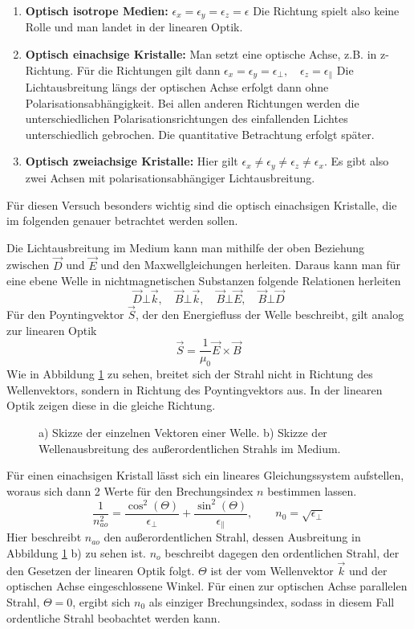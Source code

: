 \begin{enumerate}
    \item \textbf{Optisch isotrope Medien:} 
          $\epsilon_x = \epsilon_y = \epsilon_z = \epsilon$
          Die Richtung spielt also keine Rolle und man landet in der linearen Optik.

    \item \textbf{Optisch einachsige Kristalle:}
          Man setzt eine optische Achse, z.B. in z-Richtung. Für die Richtungen 
          gilt dann $\epsilon_x = \epsilon_y = \epsilon_{\bot}, \quad 
                     \epsilon_z = \epsilon_{\parallel}$
          Die Lichtausbreitung längs der optischen Achse erfolgt dann ohne
          Polarisationsabhängigkeit. Bei allen anderen Richtungen werden die 
          unterschiedlichen Polarisationsrichtungen des einfallenden Lichtes
          unterschiedlich gebrochen. Die quantitative Betrachtung erfolgt 
          später.
    \item \textbf{Optisch zweiachsige Kristalle:}
          Hier gilt $\epsilon_x \neq \epsilon_y \neq \epsilon_z \neq \epsilon_x$.
          Es gibt also zwei Achsen mit polarisationsabhängiger Lichtausbreitung.
\end{enumerate}
Für diesen Versuch besonders wichtig sind die optisch einachsigen Kristalle, die im
folgenden genauer betrachtet werden sollen.

Die Lichtausbreitung im Medium kann man mithilfe der oben Beziehung zwischen 
$\vec{D}$ und $\vec{E}$ und den Maxwellgleichungen herleiten. Daraus kann man 
für eine ebene Welle in nichtmagnetischen Substanzen folgende Relationen herleiten
\[
    \vec{D} \bot \vec{k}, \quad \vec{B} \bot \vec{k}, \quad
    \vec{B} \bot \vec{E}, \quad \vec{B} \bot \vec{D}
\]
Für den Poyntingvektor $\vec{S}$, der den Energiefluss der Welle beschreibt, 
gilt analog zur linearen Optik
\[
    \vec{S} = \frac{1}{\mu_0} \vec{E} \times \vec{B}
\]
Wie in Abbildung \ref{abb:doppel} zu sehen, breitet sich der Strahl nicht in
Richtung des Wellenvektors, sondern in Richtung des Poyntingvektors aus. In der
linearen Optik zeigen diese in die gleiche Richtung.
\begin{figure}[h]
  \centering
  
    \caption{a) Skizze der einzelnen Vektoren einer Welle. b) Skizze der 
             Wellenausbreitung des außerordentlichen Strahls im Medium.}
  \label{abb:doppel}
\end{figure}
Für einen einachsigen Kristall lässt sich ein lineares Gleichungssystem 
aufstellen, woraus sich dann 2 Werte für den Brechungsindex $n$ bestimmen lassen.
\[
    \frac{1}{n_{ao}^2} = \frac{\cos^2(\Theta)}{\epsilon_{\bot}} +
                         \frac{\sin^2(\Theta)}{\epsilon_{\parallel}},
    \qquad n_0 = \sqrt{\epsilon_{\bot}}
\]
Hier beschreibt $n_{ao}$ den außerordentlichen Strahl, dessen Ausbreitung in
Abbildung \ref{abb:doppel} b) zu sehen ist. $n_o$ beschreibt dagegen den 
ordentlichen Strahl, der den Gesetzen der linearen Optik folgt. 
$\Theta$ ist der vom Wellenvektor $\vec{k}$ und der optischen Achse 
eingeschlossene Winkel. Für einen zur optischen Achse parallelen Strahl, 
$\Theta=0$, ergibt sich $n_0$ als einziger Brechungsindex, sodass in diesem Fall
ordentliche Strahl beobachtet werden kann.

